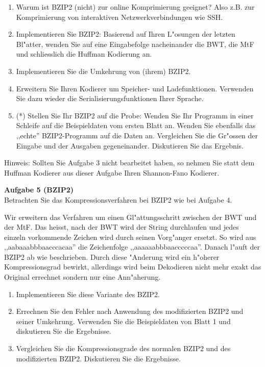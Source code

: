 \documentclass[a4paper]{article}
\begin{document}
\begin{enumerate}
\item Warum ist BZIP2 (nicht) zur online Komprimierung geeignet? Also z.B. zur
      Komprimierung von interaktiven Netzwerkverbindungen wie SSH.
\item Implementieren Sie BZIP2: Basierend auf Ihren L"osungen der letzten
      Bl"atter, wenden Sie auf eine Eingabefolge nacheinander die BWT, die MtF
      und schliesslich die Huffman Kodierung an.
\item Implementieren Sie die Umkehrung von (ihrem) BZIP2.
\item Erweitern Sie Ihren Kodierer um Speicher- und Ladefunktionen.
      Verwenden Sie dazu wieder die Serialisierungsfunktionen Ihrer Sprache.
\item(*) Stellen Sie Ihr BZIP2 auf die Probe: Wenden Sie Ihr Programm in einer
      Schleife auf die Beispieldaten vom ersten Blatt an. Wenden Sie ebenfalls
      das ,,echte'' BZIP2-Programm auf die Daten an. Vergleichen Sie die
      Gr"ossen der Eingabe und der Ausgaben gegeneinander. Diskutieren Sie das
      Ergebnis.
\end{enumerate}

Hinweis: Sollten Sie Aufgabe 3 nicht bearbeitet haben, so nehmen Sie statt dem
Huffman Kodierer aus dieser Aufgabe Ihren Shannon-Fano Kodierer.

\bigskip

{\bf Aufgabe 5  \quad(BZIP2)}\\
Betrachten Sie das Kompressionsverfahren bei BZIP2 wie bei Aufgabe 4.

Wir erweitern das Verfahren um einen Gl"attungsschritt zwischen der BWT und
der MtF. Das heisst, nach der BWT wird der String durchlaufen und jedes einzeln
vorkommende Zeichen wird durch seinen Vorg"anger ersetzt. So wird aus
,,aabaaabbbaacccacaa'' die Zeichenfolge ,,aaaaaabbbaacccccaa''. Danach l"auft
der BZIP2 ab wie beschrieben. Durch diese "Anderung wird ein h"oherer
Kompressionsgrad bewirkt, allerdings wird beim Dekodieren nicht mehr exakt das
Original errechnet sondern nur eine Ann"aherung.

\begin{enumerate}
\item Implementieren Sie diese Variante des BZIP2.
\item Errechnen Sie den Fehler nach Anwendung des modifizierten BZIP2 und seiner
      Umkehrung. Verwenden Sie die Beispieldaten von Blatt 1 und diskutieren Sie
      die Ergebnisse.
\item Vergleichen Sie die Kompressionsgrade des normalen BZIP2 und des
      modifizierten BZIP2. Diskutieren Sie die Ergebnisse.
\end{enumerate}
\end{document}
